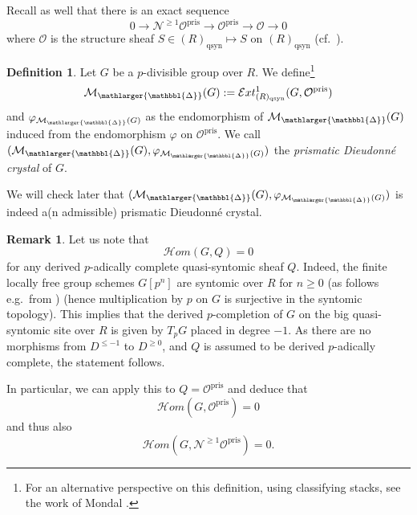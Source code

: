 \documentclass{amsart}
\newcommand{\prism}{{\mathlarger{\mathbbl{\Delta}}}}
\theoremstyle{plain}
\theoremstyle{definition}
\newtheorem{definition}[theorem]{Definition}
\newtheorem{remark}[theorem]{Remark}
\newcommand{\Fil}{\mathrm{Fil}}
\newcommand{\pris}{\mathrm{pris}}
\newcommand{\blue}[1]{{\color{black}#1}}
\begin{document}
Recall as well that there is an exact sequence
$$
0\to \mathcal{N}^{\geq 1}\mathcal{O}^{\mathrm{pris}}\to \mathcal{O}^\pris\to \mathcal{O}\to 0
$$
where $\mathcal{O}$ is the structure sheaf $S\in (R)_{\mathrm{qsyn}}\mapsto S$  on $(R)_{\mathrm{qsyn}}$ (cf.\ ).

\begin{definition}
  \label{sec:divid-prism-dieud-definition-divided-prismatic-dieudonne-crystal-of-p-divisible-groups} Let $G$ be a $p$-divisible group over $R$. We define\footnote{For an alternative perspective on this definition, using classifying stacks, see the work of Mondal \cite{mondal2021dieudonne}.}
  $$
    \mathcal{M}_{\prism}(G):=\mathcal{E}xt^1_{(R)_{\mathrm{qsyn}}}(G,\mathcal{O}^\pris) \\
  $$
  and $\varphi_{\mathcal{M}_\prism(G)}$ as the endomorphism of $\mathcal{M}_\prism(G)$ induced from the endomorphism $\varphi$ on $\mathcal{O}^\pris$.
  We call $(\mathcal{M}_\prism(G),\varphi_{\mathcal{M}_\prism(G)})$ the \textit{prismatic Dieudonn\'e crystal} of $G$.
\end{definition}

We will check later that $(\mathcal{M}_\prism(G),\varphi_{\mathcal{M}_\prism(G)})$ is indeed a(n admissible) prismatic Dieudonn\'e crystal.



\begin{remark}
\label{no-hom-btw-o-pris-and-G}
Let us note that
$$
\mathcal{H}om(G,Q)=0
$$
for any derived $p$-adically complete quasi-syntomic sheaf $Q$. Indeed, the finite locally free group schemes $G[p^n]$ are syntomic over $R$ for $n\geq 0$ (as follows e.g.\ from \cite[II.(3.2.6)]{messing_the_crystals_associated_to_barsotti_tate_groups}) \blue{(hence multiplication by $p$ on $G$ is surjective in the syntomic topology)}. This implies that the derived $p$-completion of $G$ on the big quasi-syntomic site over $R$ is given by $T_pG$ placed in degree $-1$. As there are no morphisms from $D^{\leq -1}$ to $D^{\geq 0}$, and $Q$ is assumed to be derived $p$-adically complete, the statement follows. 

In particular, we can apply this to $Q=\mathcal{O}^\pris$ and deduce that 
$$
\mathcal{H}om(G, \mathcal{O}^\pris)=0
$$
and thus also
$$
\mathcal{H}om(G,\mathcal{N}^{\geq 1} \mathcal{O}^\pris)=0.
$$
\end{remark}
\end{document}
